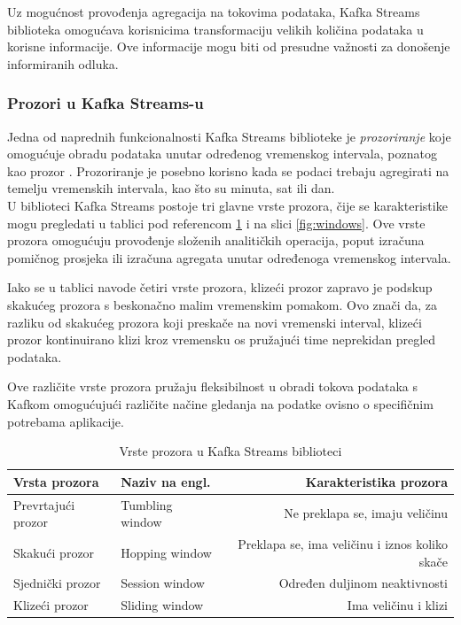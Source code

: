 \documentclass[times, utf8, diplomski]{fer}
\begin{document}
Uz mogućnost provođenja agregacija na tokovima podataka, Kafka Streams biblioteka omogućava korisnicima transformaciju velikih količina podataka u korisne informacije. Ove informacije mogu biti od presudne važnosti za donošenje informiranih odluka.

\subsubsection{Prozori u Kafka Streams-u}

Jedna od naprednih funkcionalnosti Kafka Streams biblioteke je \emph{prozoriranje}  koje omogućuje obradu podataka unutar određenog vremenskog intervala, poznatog kao prozor . Prozoriranje je posebno korisno kada se podaci trebaju agregirati na temelju vremenskih intervala, kao što su minuta, sat ili dan.\\

U biblioteci Kafka Streams postoje tri glavne vrste prozora, čije se karakteristike mogu pregledati u tablici pod referencom \ref{tbl:windows} i na slici \ref{fig:windows}. Ove vrste prozora omogućuju provođenje složenih analitičkih operacija, poput izračuna pomičnog prosjeka ili izračuna agregata unutar određenoga vremenskog intervala.

Iako se u tablici navode četiri vrste prozora, klizeći prozor  zapravo je podskup skakućeg prozora  s beskonačno malim vremenskim pomakom. Ovo znači da, za razliku od skakućeg prozora koji \glqq preskače\grqq\hspace{1pt} na novi vremenski interval, klizeći prozor kontinuirano \glqq klizi\grqq\hspace{1pt}  kroz vremensku os pružajući time neprekidan pregled podataka.

Ove različite vrste prozora pružaju fleksibilnost u obradi tokova podataka s Kafkom omogućujući različite načine gledanja na podatke ovisno o specifičnim potrebama aplikacije.

\begin{table}[htb]
\caption{Vrste prozora u Kafka Streams biblioteci}
\label{tbl:windows}
\centering
\begin{tabular}{l|l|r} \toprule
Vrsta prozora & Naziv na engl. & Karakteristika prozora \\ \midrule
Prevrtajući prozor & Tumbling window & Ne preklapa se, imaju veličinu\\
Skakući prozor & Hopping window & Preklapa se, ima veličinu i iznos koliko skače\\
Sjednički prozor & Session window & Određen duljinom neaktivnosti\\
Klizeći prozor & Sliding window & Ima veličinu i klizi \\ \bottomrule
\end{tabular}
\end{table} 
\end{document}
